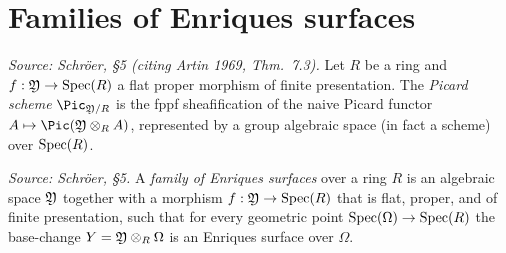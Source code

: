 \section{Families of Enriques surfaces}

\begin{definition}
  \label{def:picard-scheme}
  \uses{}
  \textit{Source: Schr\"oer, §5 (citing Artin 1969, Thm.~7.3).}
  Let \(R\) be a ring and \(f : \mathfrak{Y} \to \mathrm{Spec}(R)\) a flat proper morphism of finite presentation.
  The \emph{Picard scheme} \(\Pic_{\foY/R}\) is the fppf sheafification of the naive Picard functor
  \(A \mapsto \Pic(\foY \otimes_R A)\), represented by a group algebraic space (in fact a scheme) over \(\mathrm{Spec}(R)\).
\end{definition}

\begin{definition}
  \label{def:family-enriques-surfaces}
  \textit{Source: Schr\"oer, §5.}
  A \emph{family of Enriques surfaces} over a ring \(R\) is an algebraic space \(\mathfrak{Y}\) together with a morphism
  \(f : \mathfrak{Y} \to \mathrm{Spec}(R)\) that is flat, proper, and of finite presentation, such that for every geometric point
  \(\mathrm{Spec}(\Omega) \to \mathrm{Spec}(R)\) the base-change \(Y = \mathfrak{Y} \otimes_R \Omega\) is an Enriques surface over \(\Omega\).
\end{definition}

